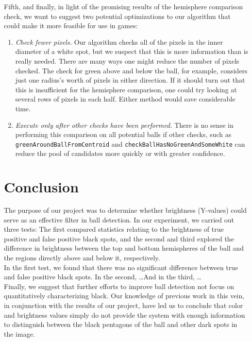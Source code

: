 \documentclass[11pt, twocolumn]{article}
\newcommand{\MARCUS}[1]{}
\begin{document}
{\indent Fifth, and finally, in light of the promising results of the hemisphere comparison check, we want to suggest two potential optimizations to our algorithm that could make it more feasible for use in games:
\begin{enumerate}
\item \textit{Check fewer pixels.} Our algorithm checks all of the pixels in the inner diameter of a white spot, but we suspect that this is more information than is really needed. There are many ways one might reduce the number of pixels checked. The check for green above and below the ball, for example, considers just one radius's worth of pixels in either direction. If it should turn out that this is insufficient for the hemisphere comparison, one could try looking at several rows of pixels in each half. Either method would save considerable time.
\item \textit{Execute only after other checks have been performed.} There is no sense in performing this comparison on all potential balls if other checks, such as \texttt{greenAroundBallFromCentroid} and \texttt{checkBallHasNoGreenAndSomeWhite} can reduce the pool of candidates more quickly or with greater confidence. 
\end{enumerate}

\section{Conclusion}
The purpose of our project was to determine whether brightness (Y-values) could serve as an effective filter in ball detection. In our experiment, we carried out three tests: The first compared statistics relating to the brightness of true positive and false positive black spots, and the second and third explored the difference in brightness between the top and bottom hemispheres of the ball and the regions directly above and below it, respectively. \\
\indent In the first test, we found that there was no significant difference between true and false positive black spots. In the second,\MARCUS{YOUR RESULTS HERE} \ldots And in the third, \MARCUS{YOUR RESULTS HERE} \ldots \\
\indent Finally, we suggest that further efforts to improve ball detection not focus on quantitatively characterizing black. Our knowledge of previous work in this vein, in conjunction with the results of our project, have led us to conclude that color and brightness values simply do not provide the system with enough information to distinguish between the black pentagons of the ball and other dark spots in the image.

}
\end{document}
